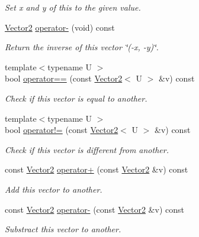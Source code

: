 \begin{DoxyCompactItemize}
\begin{DoxyCompactList}\small\item\em Set x and y of this to the given value. \end{DoxyCompactList}\item 
\hyperlink{classfuzzy_telegram_1_1_vector2}{Vector2} \hyperlink{classfuzzy_telegram_1_1_vector2_aab199326b19072cee92d5abdcf859abf}{operator-\/} (void) const 
\begin{DoxyCompactList}\small\item\em Return the inverse of this vector \char`\"{}(-\/x, -\/y)\char`\"{}. \end{DoxyCompactList}\item 
{\footnotesize template$<$typename U $>$ }\\bool \hyperlink{classfuzzy_telegram_1_1_vector2_a98520a9ab6e5c475b0229afe5a9e0db5}{operator==} (const \hyperlink{classfuzzy_telegram_1_1_vector2}{Vector2}$<$ U $>$ \&v) const 
\begin{DoxyCompactList}\small\item\em Check if this vector is equal to another. \end{DoxyCompactList}\item 
{\footnotesize template$<$typename U $>$ }\\bool \hyperlink{classfuzzy_telegram_1_1_vector2_ae4b40df1e0ae2599a3fe928e4a5db9ba}{operator!=} (const \hyperlink{classfuzzy_telegram_1_1_vector2}{Vector2}$<$ U $>$ \&v) const 
\begin{DoxyCompactList}\small\item\em Check if this vector is different from another. \end{DoxyCompactList}\item 
const \hyperlink{classfuzzy_telegram_1_1_vector2}{Vector2} \hyperlink{classfuzzy_telegram_1_1_vector2_abb6db853bfe0c0c49fd69eae7ee6244c}{operator+} (const \hyperlink{classfuzzy_telegram_1_1_vector2}{Vector2} \&v) const 
\begin{DoxyCompactList}\small\item\em Add this vector to another. \end{DoxyCompactList}\item 
const \hyperlink{classfuzzy_telegram_1_1_vector2}{Vector2} \hyperlink{classfuzzy_telegram_1_1_vector2_a5bc16d37025862c90580384b3ddd4653}{operator-\/} (const \hyperlink{classfuzzy_telegram_1_1_vector2}{Vector2} \&v) const 
\begin{DoxyCompactList}\small\item\em Substract this vector to another. \end{DoxyCompactList}\item 

\end{DoxyCompactItemize}
